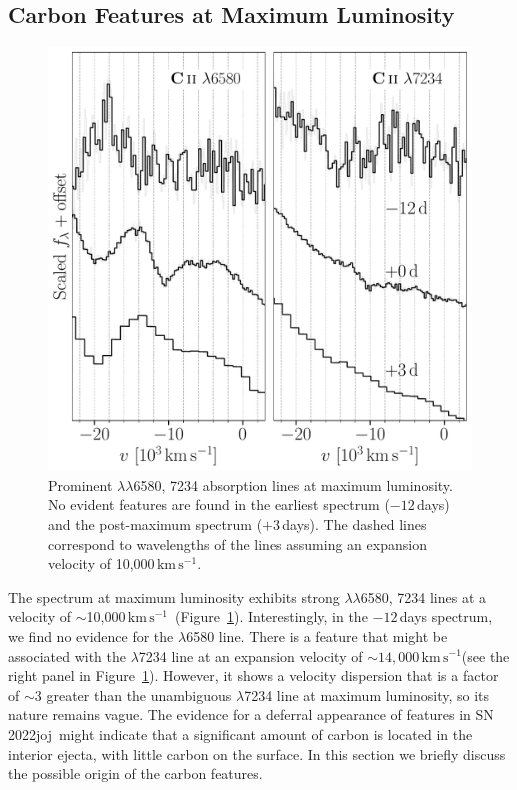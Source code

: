 \documentclass[twocolumn]{aastex631}
\newcommand{\sn}{SN\,2022joj}
\newcommand{\kms}{$\mathrm{km}\,\mathrm{s}^{-1}$}
\begin{document}
\begin{CJK*}{UTF8}{gbsn}
\subsection{Carbon Features at Maximum Luminosity}\label{sec:disc_C_II}
\begin{figure}
    \centering
    \includegraphics[width=\linewidth]{C_II.pdf}
    \caption{Prominent  $\lambda\lambda$6580, 7234 absorption lines at maximum luminosity. No evident  features are found in the earliest spectrum ($-12$\,days) and the post-maximum spectrum ($+3$\,days). The dashed lines correspond to wavelengths of the  lines assuming an expansion velocity of 10,000\,\kms.}
    \label{fig:C_II}
\end{figure}
The spectrum at maximum luminosity exhibits strong  $\lambda\lambda$6580, 7234 lines at a velocity of $\sim$10,000\,\kms\  (Figure~\ref{fig:C_II}). Interestingly, in the $-12$\,days spectrum, we find no evidence for the  $\lambda$6580 line. There is a feature that might be associated with the  $\lambda$7234 line at an expansion velocity of $\sim$$14,000$\,\kms (see the right panel in Figure~\ref{fig:C_II}). However, it shows a velocity dispersion that is a factor of $\sim$3 greater than the unambiguous  $\lambda$7234 line at maximum luminosity, so its nature remains vague. The evidence for a deferral appearance of  features in \sn\ might indicate that a significant amount of carbon is located in the interior ejecta, with little carbon on the surface. In this section we briefly discuss the possible origin of the carbon features.


\end{CJK*}
\end{document}
